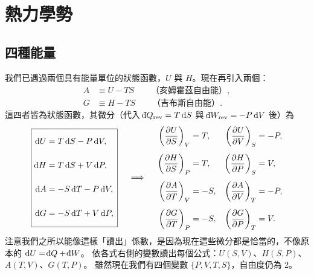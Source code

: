 \section{熱力學勢}

\subsection{四種能量}

我們已遇過兩個具有能量單位的狀態函數，$U$ 與 $H$。現在再引入兩個：
\begin{align*}
    A &\equiv U - TS \qquad \text{（亥姆霍茲自由能）},\\
    G &\equiv H - TS \qquad \text{（吉布斯自由能）}.
\end{align*}
這四者皆為狀態函數，其微分（代入 $\dbar Q_{\text{rev}}=T\,\dd S$ 與 $\dbar W_{\text{rev}}=-P\,\dd V$ 後）為
\[
    \boxed{\begin{aligned}
        \dd U &= T\,\dd S - P\,\dd V, \vphantom{\left(\frac{\partial U}{\partial S}\right)_V} \\
        \dd H &= T\,\dd S + V\,\dd P, \vphantom{\left(\frac{\partial H}{\partial S}\right)_P} \\
        \dd A &= -S\,\dd T - P\,\dd V, \vphantom{\left(\frac{\partial A}{\partial T}\right)_V} \\
        \dd G &= -S\,\dd T + V\,\dd P, \vphantom{\left(\frac{\partial G}{\partial T}\right)_P}
    \end{aligned}}
    \quad\implies\quad
    \begin{aligned}
        \left(\frac{\partial U}{\partial S}\right)_V &= T, & \left(\frac{\partial U}{\partial V}\right)_S &= -P, \\[1ex]
        \left(\frac{\partial H}{\partial S}\right)_P &= T, & \left(\frac{\partial H}{\partial P}\right)_S &= V, \\[1ex]
        \left(\frac{\partial A}{\partial T}\right)_V &= -S, & \left(\frac{\partial A}{\partial V}\right)_T &= -P, \\[1ex]
        \left(\frac{\partial G}{\partial T}\right)_P &= -S, & \left(\frac{\partial G}{\partial P}\right)_T &= V.
    \end{aligned}
\]
注意我們之所以能像這樣「讀出」係數，是因為現在這些微分都是恰當的，不像原本的 $\dd U = \dbar Q + \dbar W$。
依各式右側的變數讀出每個公式：$U(S,V)$、$H(S,P)$、$A(T,V)$、$G(T,P)$。
雖然現在我們有四個變數 $\{P,V,T,S\}$，自由度仍為 2。

